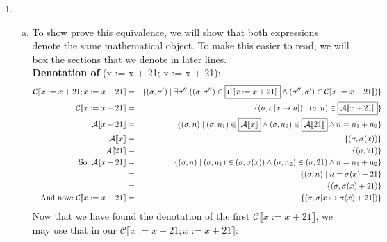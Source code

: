 \documentclass[10pt, oneside]{article}
\begin{document}
\begin{enumerate}[1.]
  \item
  \begin{enumerate} [(a)]
  \item 
  To show prove this equivalence, we will show that both expressions denote the same mathematical object. To make this easier to read, we will box the sections that we denote in later lines.\\
  
{\bf Denotation of}  (x := x + 21; x := x + 21):\\

      \begin{eqnarray*}  \mathcal{C} \llbracket x := x + 21; x := x + 21 \rrbracket & = & \{ (\sigma, \sigma') \mid \exists \sigma''.  ((\sigma, \sigma'') \in \boxed {\mathcal{C} \llbracket x := x + 21\rrbracket} \wedge (\sigma'', \sigma') \in   {\mathcal{C} \llbracket x := x + 21\rrbracket })\}   \\
    \mathcal{C} \llbracket x := x + 21\rrbracket & = & \{ (\sigma, \sigma[x \mapsto n]) \mid (\sigma, n) \in \boxed{\mathcal{A} \llbracket x + 21 \rrbracket} \} \\
     \mathcal{A} \llbracket x + 21\rrbracket & = & \{ (\sigma, n) \mid (\sigma, n_1) \in \boxed{\mathcal{A} \llbracket x \rrbracket} \wedge (\sigma, n_2) \in \boxed{\mathcal{A} \llbracket 21 \rrbracket} \wedge n = n_1 + n _2\} \\
       \mathcal{A} \llbracket x \rrbracket  & = & \{ (\sigma, \sigma(x)) \} \\
    \mathcal{A} \llbracket 21 \rrbracket  & = & \{ (\sigma, 21) \} \\
   \text{So:} \hspace{1mm} \mathcal{A} \llbracket x + 21 \rrbracket & = & \{ (\sigma, n) \mid (\sigma, n_1) \in (\sigma, \sigma(x)) \wedge (\sigma, n_2) \in (\sigma, 21) \wedge n = n_1 + n_2 \} \\
    & = & \{ (\sigma, n) \mid n = \sigma(x) + 21 \} \\
    & = & \{ (\sigma, \sigma(x) + 21) \} \\
 \text{And now:} \hspace{1mm} \mathcal{C} \llbracket x := x + 21\rrbracket & = & \{ (\sigma, \sigma[x \mapsto \sigma(x) + 21]) \} \\
  \end{eqnarray*}
  Now that we have found the denotation of the first ${\mathcal{C} \llbracket x := x + 21\rrbracket }$, we may use that in our   $\mathcal{C} \llbracket x := x + 21; x := x + 21 \rrbracket$:
  

\end{enumerate}
\end{enumerate}
\end{document}
